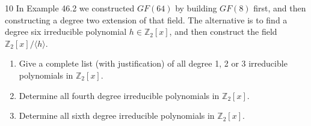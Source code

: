 \begin{problem}{10}
    In Example 46.2 we constructed $GF(64)$ by building $GF(8)$ first, and then
    constructing a degree two extension of that field. The alternative is to find a degree
    six irreducible polynomial $h \in \mathbb{Z}_2[x]$, and then construct the field
    $\mathbb{Z}_2[x]/\langle h \rangle$.
    \begin{enumerate}
        \item[(a)] Give a complete list (with justification) of all degree 1, 2 or 3
        irreducible polynomials in $\mathbb{Z}_2[x]$.
        \item[(b)] Determine all fourth degree irreducible polynomials in
        $\mathbb{Z}_2[x]$.
        \item[(c)] Determine all sixth degree irreducible polynomials in $\mathbb{Z}_2[x]$.
    \end{enumerate}
\end{problem}
\unsolved

